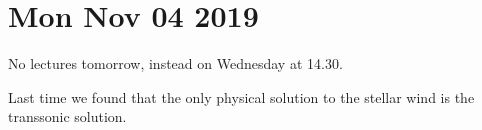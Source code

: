 \documentclass[main.tex]{subfiles}
\begin{document}
\section*{Mon Nov 04 2019}

No lectures tomorrow, instead on Wednesday at 14.30.

Last time we found that the only physical solution to the stellar wind is the transsonic solution.
\end{document}
